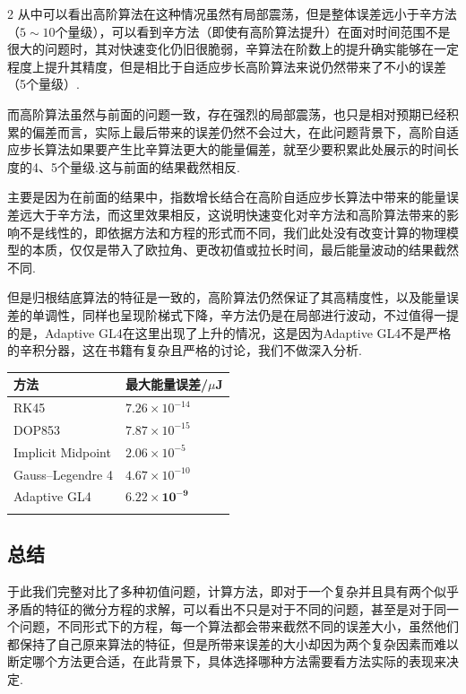 \documentclass{CLGPY}
\begin{document}
\begin{multicols}{2}
		从中可以看出高阶算法在这种情况虽然有局部震荡，但是整体误差远小于辛方法（$5\sim 10$个量级），可以看到辛方法（即使有高阶算法提升）在面对时间范围不是很大的问题时，其对快速变化仍旧很脆弱，辛算法在阶数上的提升确实能够在一定程度上提升其精度，但是相比于自适应步长高阶算法来说仍然带来了不小的误差（5个量级）.
		
		而高阶算法虽然与前面的问题一致，存在强烈的局部震荡，也只是相对预期已经积累的偏差而言，实际上最后带来的误差仍然不会过大，在此问题背景下，高阶自适应步长算法如果要产生比辛算法更大的能量偏差，就至少要积累此处展示的时间长度的4、5个量级.这与前面的结果截然相反.
		
		主要是因为在前面的结果中，指数增长结合在高阶自适应步长算法中带来的能量误差远大于辛方法，而这里效果相反，这说明快速变化对辛方法和高阶算法带来的影响不是线性的，即依据方法和方程的形式而不同，我们此处没有改变计算的物理模型的本质，仅仅是带入了欧拉角、更改初值或拉长时间，最后能量波动的结果截然不同.
		
		但是归根结底算法的特征是一致的，高阶算法仍然保证了其高精度性，以及能量误差的单调性，同样也呈现阶梯式下降，辛方法仍是在局部进行波动，不过值得一提的是，Adaptive GL4在这里出现了上升的情况，这是因为Adaptive GL4不是严格的辛积分器，这在书籍\cite{2006_Lubich_BOOK}有复杂且严格的讨论，我们不做深入分析.
		
		\begin{center}
			
			\begin{tabular}{>{\small}l >{\footnotesize\raggedright\arraybackslash}p{3.6cm}}
				\toprule
				方法 & 最大能量误差/$\mu$J \\
				\midrule
				RK45 & $7.26\times10^{-14}$ \\
				DOP853 & $7.87\times10^{-15}$ \\
				Implicit Midpoint & $2.06\times10^{-5}$ \\
				Gauss--Legendre 4 & $4.67\times10^{-10}$ \\
				Adaptive GL4 & $\mathbf{6.22\times10^{-9}}$ \\
				\bottomrule
				\label{tab:euler_error}
			\end{tabular}
		\end{center}
		
		\subsection{总结}
		于此我们完整对比了多种初值问题，计算方法，即对于一个复杂并且具有两个似乎矛盾的特征的微分方程的求解，可以看出不只是对于不同的问题，甚至是对于同一个问题，不同形式下的方程，每一个算法都会带来截然不同的误差大小，虽然他们都保持了自己原来算法的特征，但是所带来误差的大小却因为两个复杂因素而难以断定哪个方法更合适，在此背景下，具体选择哪种方法需要看方法实际的表现来决定.
		

\end{multicols}
\end{document}
